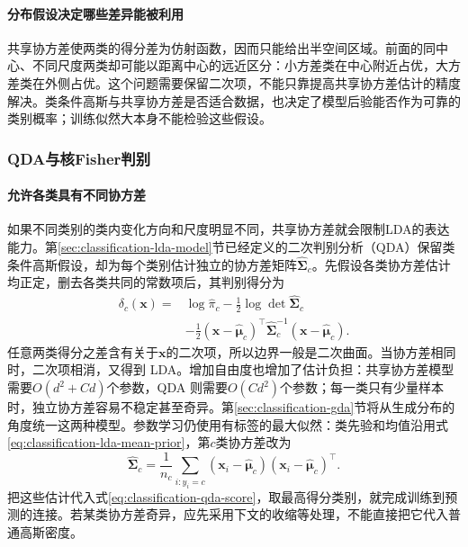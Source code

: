 \paragraph{分布假设决定哪些差异能被利用}
\label{sec:classification-lda-analysis}
共享协方差使两类的得分差为仿射函数，因而只能给出半空间区域。前面的同中心、不同尺度两类却可能以距离中心的远近区分：小方差类在中心附近占优，大方差类在外侧占优。这个问题需要保留二次项，不能只靠提高共享协方差估计的精度解决。类条件高斯与共享协方差是否适合数据，也决定了模型后验能否作为可靠的类别概率；训练似然大本身不能检验这些假设。

\subsubsection{QDA与核Fisher判别}

\paragraph{允许各类具有不同协方差}
\label{sec:classification-lda-covariance-extensions}
如果不同类别的类内变化方向和尺度明显不同，共享协方差就会限制LDA的表达能力。第\ref{sec:classification-lda-model}节已经定义的二次判别分析（QDA）保留类条件高斯假设，却为每个类别估计独立的协方差矩阵$\hat{\bm{\Sigma}}_c$。先假设各类协方差估计均正定，删去各类共同的常数项后，其判别得分为
\begin{equation}
  \begin{aligned}
    \delta_c(\bm{x})
      ={}&\log\hat{\pi}_c-\frac12\log\det\hat{\bm{\Sigma}}_c\\
        &-\frac12(\bm{x}-\hat{\bm{\mu}}_c)^\top
          \hat{\bm{\Sigma}}_c^{-1}(\bm{x}-\hat{\bm{\mu}}_c).
  \end{aligned}
  \label{eq:classification-qda-score}
\end{equation}
任意两类得分之差含有关于$\bm{x}$的二次项，所以边界一般是二次曲面。当协方差相同时，二次项相消，又得到 LDA。增加自由度也增加了估计负担：共享协方差模型需要$O(d^2+Cd)$个参数，QDA 则需要$O(Cd^2)$个参数；每一类只有少量样本时，独立协方差容易不稳定甚至奇异。第\ref{sec:classification-gda}节将从生成分布的角度统一这两种模型。参数学习仍使用有标签的最大似然：类先验和均值沿用式\eqref{eq:classification-lda-mean-prior}，第$c$类协方差改为
\[
  \hat{\bm\Sigma}_c=\frac1{n_c}\sum_{i:y_i=c}
    (\bm x_i-\hat{\bm\mu}_c)(\bm x_i-\hat{\bm\mu}_c)^\top.
\]
把这些估计代入式\eqref{eq:classification-qda-score}，取最高得分类别，就完成训练到预测的连接。若某类协方差奇异，应先采用下文的收缩等处理，不能直接把它代入普通高斯密度。

